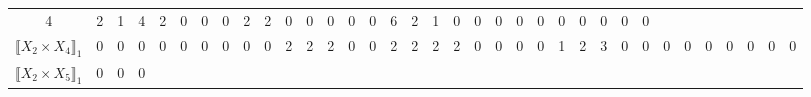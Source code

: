 \documentclass[12pt]{article}
\theoremstyle{definition}
\theoremstyle{remark}
\begin{document}
{\begin{table}[H]
\begin{adjustbox}{angle=90}
{\begin{tabular}{c||c|c|c|c|c|c|c|c|c|c|c|c|c|c|c|c|c|c|c|c|c|c|c|c|c|c|c|c|c|c|c|c|c|c}
4  & %
2  & %
1  & %
4  & %
2  & %
0  & %
0  & %
0  & %
2  & %
2  & %
0  & %
0  & %
0  & %
0  & %
0  & %
6  & %
2  & %
1  & %
0  & %
0  & %
0  & %
0  & %
0  & %
0  & %
0  & %
0  & %
0  & %
0  %
\\
$\llbracket X_2 \times X_4 \rrbracket_1$ &
0  & %
0  & %
0  & %
0  & %
0  & %
0  & %
0  & %
0  & %
0  & %
2  & %
2  & %
2  & %
0  & %
0  & %
2  & %
2  & %
2  & %
2  & %
0  & %
0  & %
0  & %
0  & %
1  & %
2  & %
3  & %
0  & %
0  & %
0  & %
0  & %
0  & %
0  & %
0  & %
0  & %
0   %
\\
$\llbracket X_2 \times X_5 \rrbracket_1$ &
0  & %
0  & %
0  & %

\end{tabular}}
\end{adjustbox}
\end{table}}
\end{document}
